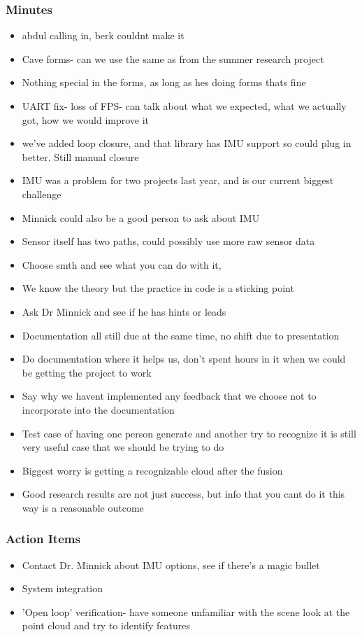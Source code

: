 		\subsubsection*{Minutes}
			\begin{itemize}
				\item abdul calling in, berk couldnt make it
				\item Cave forms- can we use the same as from the summer research project
				\item Nothing special in the forms, as long as hes doing forms thats fine
				\item UART fix- loss of FPS- can talk about what we expected, what we actually got, how we would improve it
				\item we've added loop closure, and that library has IMU support so could plug in better. Still manual closure
				\item IMU was a problem for two projects last year, and is our current biggest challenge
				\item Minnick could also be a good person to ask about IMU
				\item Sensor itself has two paths, could possibly use more raw sensor data
				\item Choose smth and see what you can do with it, 
				\item We know the theory but the practice in code is a sticking point
				\item Ask Dr Minnick and see if he has hints or leads
				\item Documentation all still due at the same time, no shift due to presentation
				\item Do documentation where it helps us, don't spent hours in it when we could be getting the project to work
				\item Say why we havent implemented any feedback that we choose not to incorporate into the documentation
				\item Test case of having one person generate and another try to recognize it is still very useful case that we should be trying to do
				\item Biggest worry is getting a recognizable cloud after the fusion
				\item Good research results are not just success, but info that you cant do it this way is a reasonable outcome
			\end{itemize}

		\subsubsection*{Action Items}
			\begin{itemize}
				\item Contact Dr. Minnick about IMU options, see if there's a magic bullet
				\item System integration
				\item 'Open loop' verification- have someone unfamiliar with the scene look at the point cloud and try to identify features
			\end{itemize}

